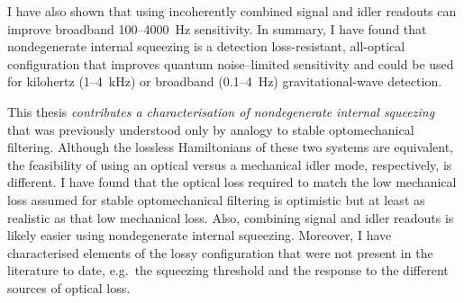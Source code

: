 I have also shown that using incoherently combined signal and idler readouts can improve broadband 100--4000~Hz sensitivity. %
In summary, I have found that nondegenerate internal squeezing is a detection loss-resistant, all-optical configuration that improves quantum noise--limited sensitivity and could be used for kilohertz (1--4~kHz) or broadband (0.1--4~Hz) gravitational-wave detection.

This thesis \emph{contributes a characterisation of nondegenerate internal squeezing} that was previously understood only by analogy to stable optomechanical filtering. Although the lossless Hamiltonians of these two systems are equivalent, the feasibility of using an optical versus a mechanical idler mode, respectively, is different. I have found that the optical loss required to match the low mechanical loss assumed for stable optomechanical filtering is optimistic but at least as realistic as that low mechanical loss. Also, combining signal and idler readouts is likely easier using nondegenerate internal squeezing. Moreover, I have characterised elements of the lossy configuration that were not present in the literature to date, e.g.\ the squeezing threshold and the response to the different sources of optical loss.



